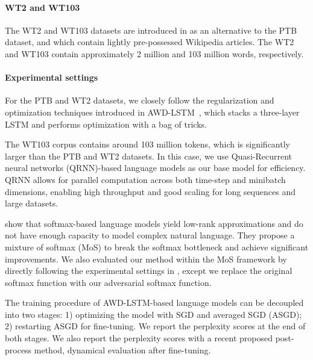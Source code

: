\documentclass{article}
\begin{document}
\paragraph{WT2 and WT103
} 
The WT2 and WT103 datasets are introduced in \citet{merity2016pointer} as an alternative to the PTB dataset, 
and which contain lightly pre-possessed Wikipedia articles. 
The WT2 and WT103 contain approximately 2 million and 103 million words, respectively. 


\paragraph{Experimental settings}
For the PTB and WT2 datasets, 
we closely follow the regularization and optimization techniques introduced in
AWD-LSTM~\citep{merity2017regularizing},
which stacks a three-layer LSTM and 
performs optimization with a bag of tricks.







The WT103 corpus contains around 103 million tokens, which is significantly larger than 
the PTB and WT2 datasets. 
In this case, we use Quasi-Recurrent neural networks (QRNN)-based language models \citep{merity2018analysis, bradbury2016quasi} as our base model for efficiency. 
QRNN allows for parallel computation across both time-step and minibatch dimensions,
enabling high throughput and good scaling for long sequences and large datasets. 


\citet{yang2017breaking} show that softmax-based language models yield low-rank
approximations and do not have enough capacity to model complex natural language.
They propose a mixture of softmax (MoS) to break the softmax bottleneck and achieve
significant improvements. 
We also evaluated our method within the MoS framework by 
directly following the experimental settings in \citet{yang2017breaking}, 
except we replace the original softmax function with our adversarial softmax function.

The training procedure of AWD-LSTM-based language models can be decoupled into two stages: 1) optimizing the model with SGD and averaged SGD (ASGD); 
2) restarting ASGD for fine-tuning.
We report the perplexity scores at the end of both stages.
We also report the perplexity scores with a recent proposed post-process method, dynamical evaluation \citep{krause2017dynamic}
after fine-tuning.
\end{document}
